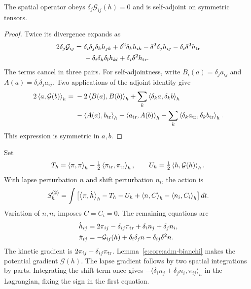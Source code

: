 \begin{lemma}
\label{c:core:adm-bianchi}
The spatial operator obeys $\delta_j\mathcal G_{ij}(h)=0$ and is
self-adjoint on symmetric tensors.
\end{lemma}

\begin{proof}
Twice its divergence expands as
\begin{align*}
 2\delta_j\mathcal G_{ij}
 ={}&\delta_i\delta_j\delta_kh_{jk}
 +\delta^2\delta_kh_{ik}-\delta^2\delta_jh_{ij}
 -\delta_i\delta^2h_{\rm tr}\\
 &-\delta_i\delta_k\delta_lh_{kl}
 +\delta_i\delta^2h_{\rm tr}.
\end{align*}
The terms cancel in three pairs. For self-adjointness, write
$B_i(a)=\delta_ja_{ij}$ and $A(a)=\delta_i\delta_ja_{ij}$. Two
applications of the adjoint identity give
\begin{align*}
 2\left\langle a,\mathcal G(b)\right\rangle_h
 ={}&-2\left\langle B(a),B(b)\right\rangle_h
 +\sum_k\left\langle\delta_ka,\delta_kb\right\rangle_h\\
 &-\left\langle A(a),b_{\rm tr}\right\rangle_h
 -\left\langle a_{\rm tr},A(b)\right\rangle_h
 -\sum_k\left\langle\delta_ka_{\rm tr},\delta_kb_{\rm tr}\right\rangle_h.
\end{align*}
This expression is symmetric in $a,b$.
\end{proof}

Set
\[
 T_h=\left\langle\pi,\pi\right\rangle_h-\tfrac12\left\langle\pi_{\rm tr},\pi_{\rm tr}\right\rangle_h,
 \qquad U_h=\tfrac12\left\langle h,\mathcal G(h)\right\rangle_h.
\]
With lapse perturbation $n$ and shift perturbation $n_i$, the action is
\begin{equation}
 S_h^{(2)}=\int\left[
 \left\langle\pi,\dot h\right\rangle_h-T_h-U_h
 +\left\langle n,C\right\rangle_h-\left\langle n_i,C_i\right\rangle_h\right]dt.
 \label{c:core:adm-action}
\end{equation}
Variation of $n,n_i$ imposes $C=C_i=0$. The remaining equations are
\begin{align}
 \dot h_{ij}&=2\pi_{ij}-\delta_{ij}\pi_{\rm tr}
             +\delta_in_j+\delta_jn_i,\nonumber\\
 \dot\pi_{ij}&=-\mathcal G_{ij}(h)
              +\delta_i\delta_jn-\delta_{ij}\delta^2n.
 \label{c:core:adm-evolution}
\end{align}
The kinetic gradient is $2\pi_{ij}-\delta_{ij}\pi_{\rm tr}$.
Lemma~\ref{c:core:adm-bianchi} makes the potential gradient
$\mathcal G(h)$. The lapse gradient follows by two spatial
integrations by parts. Integrating the shift term once gives
$-\langle\delta_in_j+\delta_jn_i,\pi_{ij}\rangle_h$ in the
Lagrangian, fixing the sign in the first equation.

